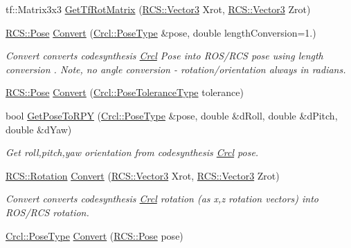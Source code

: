 \begin{DoxyCompactItemize}
\item 
tf\-::\-Matrix3x3 \hyperlink{namespaceCrcl_aa63409c6fcf29259c733bd3221e5a6b2}{Get\-Tf\-Rot\-Matrix} (\hyperlink{namespaceRCS_a688a9db9f1e17b76c410c539997d07a7}{R\-C\-S\-::\-Vector3} Xrot, \hyperlink{namespaceRCS_a688a9db9f1e17b76c410c539997d07a7}{R\-C\-S\-::\-Vector3} Zrot)
\item 
\hyperlink{namespaceRCS_aa07e45d8a50e30064283d2b38087f999}{R\-C\-S\-::\-Pose} \hyperlink{namespaceCrcl_abd79cdab59edf05f88b02e6963862813}{Convert} (\hyperlink{namespaceCrcl_acc6c82b52280f4d0e74b82a92400956e}{Crcl\-::\-Pose\-Type} \&pose, double length\-Conversion=1.)
\begin{DoxyCompactList}\small\item\em Convert converts codesynthesis \hyperlink{namespaceCrcl}{Crcl} Pose into R\-O\-S/\-R\-C\-S pose using length conversion . Note, no angle conversion -\/ rotation/orientation always in radians. \end{DoxyCompactList}\item 
\hyperlink{namespaceRCS_aa07e45d8a50e30064283d2b38087f999}{R\-C\-S\-::\-Pose} \hyperlink{namespaceCrcl_aa06759fd113a2c191dae2a8f0cbd66b1}{Convert} (\hyperlink{namespaceCrcl_ac805071e16341b82d4fa4e12b7f3ac6f}{Crcl\-::\-Pose\-Tolerance\-Type} tolerance)
\item 
bool \hyperlink{namespaceCrcl_a394a527b4609a6d5b444f30bb9384f1a}{Get\-Pose\-To\-R\-P\-Y} (\hyperlink{namespaceCrcl_acc6c82b52280f4d0e74b82a92400956e}{Crcl\-::\-Pose\-Type} \&pose, double \&d\-Roll, double \&d\-Pitch, double \&d\-Yaw)
\begin{DoxyCompactList}\small\item\em Get roll,pitch,yaw orientation from codesynthesis \hyperlink{namespaceCrcl}{Crcl} pose. \end{DoxyCompactList}\item 
\hyperlink{namespaceRCS_a3fd915276fdb632d217c560523c320e0}{R\-C\-S\-::\-Rotation} \hyperlink{namespaceCrcl_a3cc4f0a80c975f2afab38ab2de262d1f}{Convert} (\hyperlink{namespaceRCS_a688a9db9f1e17b76c410c539997d07a7}{R\-C\-S\-::\-Vector3} Xrot, \hyperlink{namespaceRCS_a688a9db9f1e17b76c410c539997d07a7}{R\-C\-S\-::\-Vector3} Zrot)
\begin{DoxyCompactList}\small\item\em Convert converts codesynthesis \hyperlink{namespaceCrcl}{Crcl} rotation (as x,z rotation vectors) into R\-O\-S/\-R\-C\-S rotation. \end{DoxyCompactList}\item 
\hyperlink{namespaceCrcl_acc6c82b52280f4d0e74b82a92400956e}{Crcl\-::\-Pose\-Type} \hyperlink{namespaceCrcl_ac74920bcb32be055b5f94010fed04cb1}{Convert} (\hyperlink{namespaceRCS_aa07e45d8a50e30064283d2b38087f999}{R\-C\-S\-::\-Pose} pose)

\end{DoxyCompactItemize}
